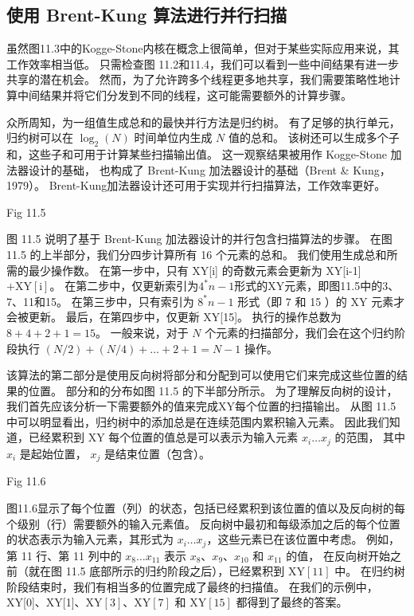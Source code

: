 \subsection{使用 Brent-Kung 算法进行并行扫描}
虽然图11.3中的Kogge-Stone内核在概念上很简单，但对于某些实际应用来说，其工作效率相当低。 
只需检查图 11.2和11.4，我们可以看到一些中间结果有进一步共享的潜在机会。 
然而，为了允许跨多个线程更多地共享，我们需要策略性地计算中间结果并将它们分发到不同的线程，这可能需要额外的计算步骤。

众所周知，为一组值生成总和的最快并行方法是归约树。 
有了足够的执行单元，归约树可以在 $\log_{2}(N)$ 时间单位内生成 $N$ 值的总和。 
该树还可以生成多个子和，这些子和可用于计算某些扫描输出值。 
这一观察结果被用作 Kogge-Stone 加法器设计的基础，
也构成了 Brent-Kung 加法器设计的基础（Brent \& Kung，1979）。 
Brent-Kung加法器设计还可用于实现并行扫描算法，工作效率更好。

{\color{red} Fig 11.5}

图 11.5 说明了基于 Brent-Kung 加法器设计的并行包含扫描算法的步骤。 
在图 11.5 的上半部分，我们分四步计算所有 16 个元素的总和。 我们使用生成总和所需的最少操作数。 
在第一步中，只有 XY[i] 的奇数元素会更新为 XY[i-1] $+\mathrm{XY}[\mathrm{i}]$。 
在第二步中，仅更新索引为$4^{*} n-1$形式的XY元素，即图11.5中的3、7、11和15。 
在第三步中，只有索引为 $8^{*} n-1$ 形式（即 7 和 15 ）的 XY 元素才会被更新。 
最后，在第四步中，仅更新 XY[15]。 执行的操作总数为$8+4+2+1=15$。 
一般来说，对于 $N$ 个元素的扫描部分，我们会在这个归约阶段执行 $(N / 2)+(N / 4)+\ldots+2+1=N-1$ 操作。

该算法的第二部分是使用反向树将部分和分配到可以使用它们来完成这些位置的结果的位置。 
部分和的分布如图 11.5 的下半部分所示。 为了理解反向树的设计，我们首先应该分析一下需要额外的值来完成XY每个位置的扫描输出。 
从图 11.5 中可以明显看出，归约树中的添加总是在连续范围内累积输入元素。 
因此我们知道，已经累积到 XY 每个位置的值总是可以表示为输入元素 $x_{i} \ldots x_{j}$ 的范围，
其中 $x_{i}$ 是起始位置， $x_{j}$ 是结束位置（包含）。

{\color{red} Fig 11.6}

图11.6显示了每个位置（列）的状态，包括已经累积到该位置的值以及反向树的每个级别（行）需要额外的输入元素值。 
反向树中最初和每级添加之后的每个位置的状态表示为输入元素，其形式为 $x_{i} \ldots x_{j}$，这些元素已在该位置中考虑。 
例如，第 11 行、第 11 列中的 $x_{8} \ldots x_{11}$ 表示 $x_{8}、x_{9}、x_{10}$ 和 $x_{11}$ 的值，
在反向树开始之前（就在图 11.5 底部所示的归约阶段之后），已经累积到 $\mathrm{XY}[11]$ 中。 
在归约树阶段结束时，我们有相当多的位置完成了最终的扫描值。 
在我们的示例中，XY[0]、XY[1]、$\mathrm{XY}[3]$、$\mathrm{XY}[7]$ 和 $\mathrm{XY}[15]$ 都得到了最终的答案。

